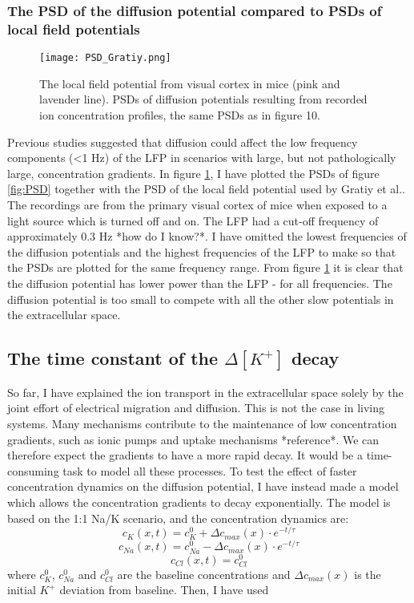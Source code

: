 \documentclass{article}
\begin{document}
\subsubsection{The PSD of the diffusion potential compared to PSDs of local field potentials}

\begin{figure}
  \texttt{[image: PSD\_Gratiy.png]}
  \caption{The local field potential from visual cortex in mice (pink and lavender line). PSDs of diffusion potentials resulting from recorded ion concentration profiles, the same PSDs as in figure 10.}
  \label{fig:PSD_Gratiy}
\end{figure}

Previous studies suggested that diffusion could affect the low frequency components (<1 Hz) of the LFP in scenarios with large, but not pathologically large, concentration gradients. In figure \ref{fig:PSD_Gratiy}, I have plotted the PSDs of figure \ref{fig:PSD} together with the PSD of the local field potential used by Gratiy et al.. The recordings are from the primary visual cortex of mice when exposed to a light source which is turned off and on. The LFP had a cut-off frequency of approximately 0.3 Hz *how do I know?*. I have omitted the lowest frequencies of the diffusion potentials and the highest frequencies of the LFP to make so that the PSDs are plotted for the same frequency range. From figure \ref{fig:PSD_Gratiy} it is clear that the diffusion potential has lower power than the LFP  - for all frequencies. The diffusion potential is too small to compete with all the other slow potentials in the extracellular space. 

\subsection{The time constant of the  $\Delta [K^+]$ decay}\label{exponential decay}
So far, I have explained the ion transport in the extracellular space solely by the joint effort of electrical migration and diffusion. This is not the case in living systems. Many mechanisms contribute to the maintenance of low concentration gradients, such as ionic pumps and uptake mechanisms *reference*. We can therefore expect the gradients to have a more rapid decay. It would be a time-consuming task to model all these processes. To test the effect of faster concentration dynamics on the diffusion potential, I have instead made a model which allows the concentration gradients to decay exponentially. The model is based on the 1:1 Na/K scenario, and the concentration dynamics are:
$$
c_{K}(x,t) = c_{K}^0 +\Delta c_{max}(x) \cdot e^{-t/\tau}
$$
$$
c_{Na}(x,t) = c_{Na}^0 -\Delta c_{max}(x) \cdot e^{-t/\tau}
$$
$$
c_{Cl}(x,t) = c_{Cl}^0
$$
where $c_{K}^0$, $c_{Na}^0$ and $c_{Cl}^0$ are the baseline concentrations and $\Delta c_{max} (x)$ is the initial $K^+$ deviation from baseline.  Then, I have used 
\end{document}
